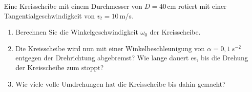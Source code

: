 \begin{ExerciseBlock}
Eine Kreisscheibe mit einem Durchmesser von $D=40 \,$cm rotiert mit einer Tangentialgeschwindigkeit von $v_t = 10 \,$m/s.

\begin{enumerate}
	\item Berechnen Sie die Winkelgeschwindigkeit $\omega_0$ der Kreisscheibe.

	\item Die Kreisscheibe wird nun mit einer Winkelbeschleunigung von $\alpha = 0,1 \,s^{-2}$ entgegen der Drehrichtung abgebremst? Wie lange dauert es, bis die Drehung der Kreisscheibe zum stoppt?

	\item Wie viele volle Umdrehungen hat die Kreisscheibe bis dahin gemacht?

\end{enumerate}
\end{ExerciseBlock}
